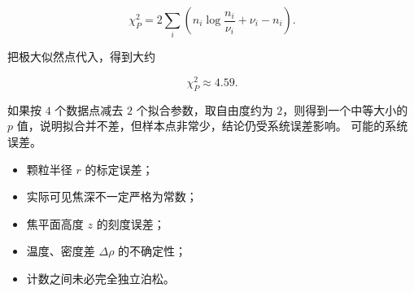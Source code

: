 \begin{question}
\begin{solution}
\begin{enumerate}
\[
\chi_P^2=2\sum_i\left(n_i\log\frac{n_i}{\nu_i}+\nu_i-n_i\right).
\]

把极大似然点代入，得到大约

\[
\chi_P^2\approx4.59.
\]

如果按 \(4\) 个数据点减去 \(2\) 个拟合参数，取自由度约为
\(2\)，则得到一个中等大小的 \(p\)
值，说明拟合并不差，但样本点非常少，结论仍受系统误差影响。
可能的系统误差。

\begin{itemize}
\item
  颗粒半径 \(r\) 的标定误差；
\item
  实际可见焦深不一定严格为常数；
\item
  焦平面高度 \(z\) 的刻度误差；
\item
  温度、密度差 \(\Delta\rho\) 的不确定性；
\item
  计数之间未必完全独立泊松。
\end{itemize}
\end{enumerate}
\end{solution}
\end{question}

